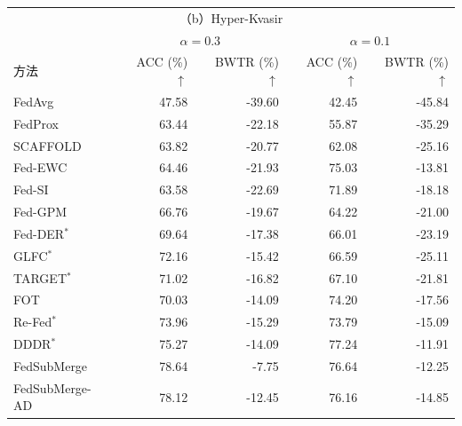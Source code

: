 \begin{table}[!htbp]
\begin{tabular*}{\textwidth}{@{\extracolsep{\fill}}lrrrr@{}}
\toprule
\multicolumn{5}{c}{（b）Hyper-Kvasir} \\
 & \multicolumn{2}{c}{$\alpha=0.3$} & \multicolumn{2}{c}{$\alpha=0.1$} \\
\cmidrule(lr){2-3}\cmidrule(lr){4-5}
方法 & \shortstack{ACC\\(\%) $\uparrow$} & \shortstack{BWTR\\(\%) $\uparrow$} & \shortstack{ACC\\(\%) $\uparrow$} & \shortstack{BWTR\\(\%) $\uparrow$} \\
\midrule
FedAvg & 47.58 & -39.60 & 42.45 & -45.84 \\
FedProx & 63.44 & -22.18 & 55.87 & -35.29 \\
SCAFFOLD & 63.82 & -20.77 & 62.08 & -25.16 \\
Fed-EWC & 64.46 & -21.93 & 75.03 & -13.81 \\
Fed-SI & 63.58 & -22.69 & 71.89 & -18.18 \\
Fed-GPM & 66.76 & -19.67 & 64.22 & -21.00 \\
Fed-DER$^{\ast}$ & 69.64 & -17.38 & 66.01 & -23.19 \\
GLFC$^{\ast}$ & 72.16 & -15.42 & 66.59 & -25.11 \\
TARGET$^{\ast}$ & 71.02 & -16.82 & 67.10 & -21.81 \\
FOT & 70.03 & -14.09 & 74.20 & -17.56 \\
Re-Fed$^{\ast}$ & 73.96 & -15.29 & 73.79 & -15.09 \\
DDDR$^{\ast}$ & 75.27 & -14.09 & 77.24 & -11.91 \\
\midrule
FedSubMerge & 78.64 & -7.75 & 76.64 & -12.25 \\
FedSubMerge-AD & 78.12 & -12.45 & 76.16 & -14.85 \\
\bottomrule
\end{tabular*}
\end{table}

